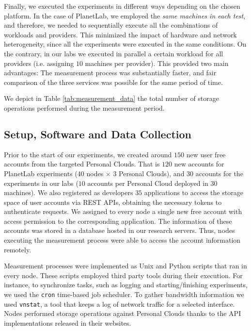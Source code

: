 Finally, we executed the experiments
in different ways depending on the chosen platform. In the case of
PlanetLab, we employed the \textit{same machines in each test}, and therefore, 
we needed to sequentially execute all the combinations of workloads and providers. 
This minimized the impact of hardware and network
heterogeneity, since all the experiments were executed in the same conditions.
On the contrary, in our labs we executed in parallel a certain workload
for all providers (i.e. assigning $10$ machines per provider).
This provided two main advantages: The measurement process was
substantially faster, and fair comparison of the three services
was possible for the same period of time. 
 
We depict in Table \ref{tab:measurement_data} the total 
number of storage operations performed during the measurement period.

\subsection{Setup, Software and Data Collection}

Prior to the start of our experiments, we created 
around $150$ new user free accounts from the targeted Personal Clouds.
That is $120$ new accounts for PlanetLab experiments ($40$ nodes
$\times$ $3$ Personal Clouds), and $30$ accounts for the experiments
in our labs ($10$ accounts per Personal Cloud deployed in $30$ machines). 
We also registered as developers $35$ applications to access the storage
space of user accounts via REST APIs, obtaining the necessary tokens
to authenticate requests.
We assigned to every node a single new free account with access permission
to the corresponding application.
The information of these accounts was stored in a database hosted in our research servers.
Thus, nodes executing the measurement process were able to access the
account information remotely. 

Measurement processes were implemented as
Unix and Python scripts that ran in every node. These scripts employed
third party tools during their execution. For instance, to synchronize tasks, 
such as logging and starting/finishing
experiments, we used the \texttt{cron} time-based job scheduler.
To gather bandwidth information we used
\texttt{vnstat}, %
a tool that keeps a log of network 
traffic for a selected interface. Nodes performed storage operations against Personal Clouds 
thanks to the API implementations released in their websites. 

